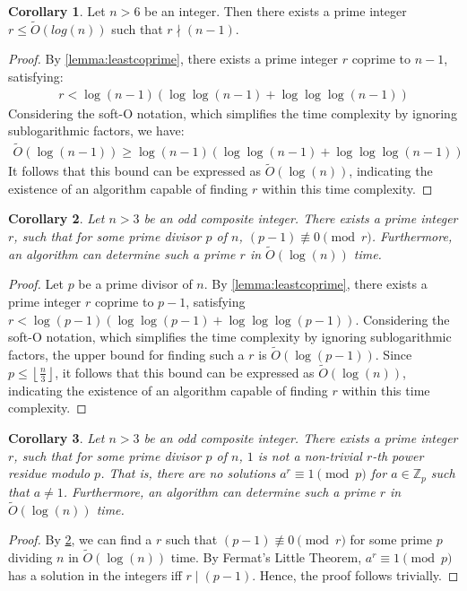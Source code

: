 \documentclass{article}
\theoremstyle{plain}
\theoremstyle{definition}
\newtheorem{corollary}{Corollary}
\newcommand{\floor}[1]{\left\lfloor #1 \right\rfloor}
\newcommand{\D}{r}
\begin{document}
\begin{corollary} \label{corollary:leastcoprimebounds}
Let $n > 6$ be an integer. Then there exists a prime integer $\D \leq \tilde{O}(log(n))$ such that $\D \nmid (n-1)$. 
\end{corollary}
\begin{proof}
By \cref{lemma:leastcoprime}, there exists a prime integer $\D$ coprime to $n-1$, satisfying:
\begin{align*}
    \D < \log(n-1) \left( \log\log(n-1) + \log\log\log(n-1) \right)
\end{align*}
Considering the soft-O notation, which simplifies the time complexity by ignoring sublogarithmic factors, we have:
\begin{align*}
    \tilde{O}(\log(n-1)) \geq \log(n-1) \left( \log\log(n-1) + \log\log\log(n-1) \right)
\end{align*}
It follows that this bound can be expressed as $\tilde{O}(\log(n))$, indicating the existence of an algorithm capable of finding $\D$ within this time complexity.
\end{proof}

\begin{corollary} \label{corollary:findingprimep}
\textit{Let $n>3$ be an odd composite integer. There exists a prime integer $\D$, such that for some prime divisor $p$ of $n$, $(p-1) \not\equiv 0 \pmod{\D}$. Furthermore, an algorithm can determine such a prime $\D$ in $\tilde{O}(\log(n))$ time.}
\end{corollary}
\begin{proof}
Let $p$ be a prime divisor of $n$. By \cref{lemma:leastcoprime}, there exists a prime integer $\D$ coprime to $p-1$, satisfying $\D < \log(p-1) \left( \log\log(p-1) + \log\log\log(p-1) \right)$. Considering the soft-O notation, which simplifies the time complexity by ignoring sublogarithmic factors, the upper bound for finding such a $\D$ is $\tilde{O}(\log(p-1))$. Since $p \leq \floor{\frac{n}{3}}$, it follows that this bound can be expressed as $\tilde{O}(\log(n))$, indicating the existence of an algorithm capable of finding $\D$ within this time complexity.
\end{proof}

\begin{corollary} \label{corollary:findingprimepnonresidue}
\textit{Let $n>3$ be an odd composite integer. There exists a prime integer $\D$, such that for some prime divisor $p$ of $n$, $1$ is not a non-trivial $\D$-th power residue modulo $p$. That is, there are no solutions $a^\D \equiv 1 \pmod{p}$ for $a \in \mathbb{Z}_p$ such that $a \not= 1$. Furthermore, an algorithm can determine such a prime $\D$ in $\tilde{O}(\log(n))$ time.}
\end{corollary}
\begin{proof}
By \cref{corollary:findingprimep}, we can find a $\D$ such that $(p-1) \not\equiv 0 \pmod{\D}$ for some prime $p$ dividing $n$ in $\tilde{O}(\log(n))$ time. By Fermat's Little Theorem, $a^\D \equiv 1 \pmod{p}$ has a solution in the integers iff $\D \mid (p-1)$. Hence, the proof follows trivially.
\end{proof}
\end{document}
